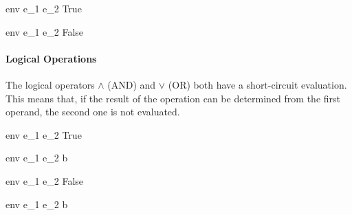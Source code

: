 \documentclass{article}
\begin{document}
	{\mbox{env} \vdash e_1 \neq e_2 \Downarrow True}
	
	{\mbox{env} \vdash e_1 \neq e_2 \Downarrow False}
	
\paragraph{Logical Operations}
The logical operators $\wedge$ (AND) and $\vee$ (OR) both have a short-circuit evaluation. This means that, if the result of the operation can be determined from the first operand, the second one is not evaluated.
	
	{\mbox{env} \vdash e_1 \vee e_2 \Downarrow True}
	
	{\mbox{env} \vdash e_1 \vee e_2 \Downarrow b}
	
	{\mbox{env} \vdash e_1 \wedge e_2 \Downarrow False}
	
	{\mbox{env} \vdash e_1 \wedge e_2 \Downarrow b}
	
\end{document}
